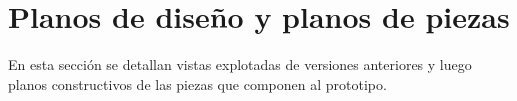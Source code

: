 \section{Planos de diseño y planos de piezas}
En esta sección se detallan vistas explotadas de versiones anteriores 
y luego planos constructivos de las piezas que componen al prototipo.























% 

